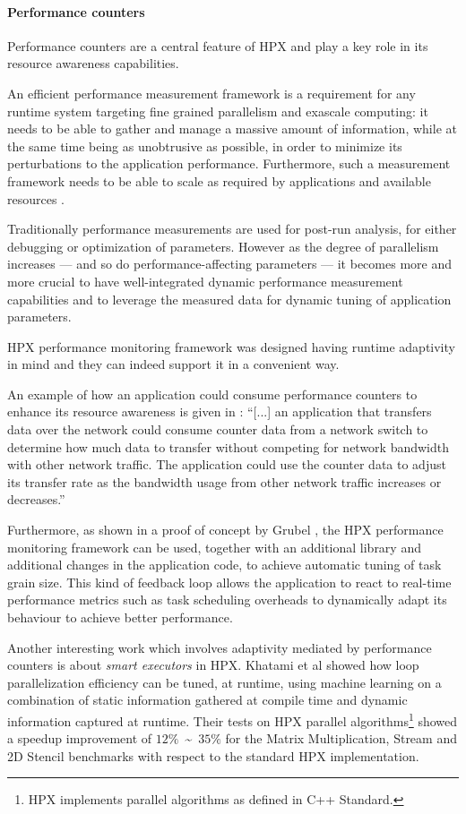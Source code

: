 \paragraph{Performance counters}
Performance counters are a central feature of HPX and play a key role in its resource awareness capabilities.

An efficient performance measurement framework is a requirement for any runtime system targeting fine grained parallelism and exascale computing: it needs to be able to gather and manage a massive amount of information, while at the same time being as unobtrusive as possible, in order to minimize its perturbations to the application performance. Furthermore, such a measurement framework needs to be able to scale as required by applications and available resources \cite{amatya2014parallel}.

Traditionally performance measurements are used for post-run analysis, for either debugging or optimization of parameters.
However as the degree of parallelism increases --- and so do performance-affecting parameters --- it becomes more and more crucial to have well-integrated dynamic performance measurement capabilities and to leverage the measured data for dynamic tuning of application parameters.

HPX performance monitoring framework was designed having runtime adaptivity in mind \cite{kaiser2014hpx} and they can indeed support it in a convenient way.

An example of how an application could consume performance counters to enhance its resource awareness is given in \cite{grubel2016dynamic}:
``[...] an application that transfers data over the network could consume counter data from a network switch to determine how much data to transfer without competing for network bandwidth with other network traffic. The application could use the counter data to adjust its transfer rate as the bandwidth usage from other network traffic increases or decreases.''

Furthermore, as shown in a proof of concept by Grubel \cite{grubel2016dynamic}, the HPX performance monitoring framework can be used, together with an additional library and additional changes in the application code, to achieve automatic tuning of task grain size. This kind of feedback loop allows the application to react to real-time performance metrics such as task scheduling overheads to dynamically adapt its behaviour to achieve better performance.

Another interesting work which involves adaptivity mediated by performance counters is about \emph{smart executors} in HPX. Khatami et al \cite{khatami2017hpx} showed how loop parallelization efficiency can be tuned, at runtime, using machine learning on a combination of static information gathered at compile time and dynamic information captured at runtime. Their tests on HPX parallel algorithms\footnote{HPX implements parallel algorithms as defined in C++ Standard.} showed a speedup improvement of $12\%$~\textasciitilde~$35\%$ for the Matrix Multiplication, Stream and 2D Stencil benchmarks with respect to the standard HPX implementation.

